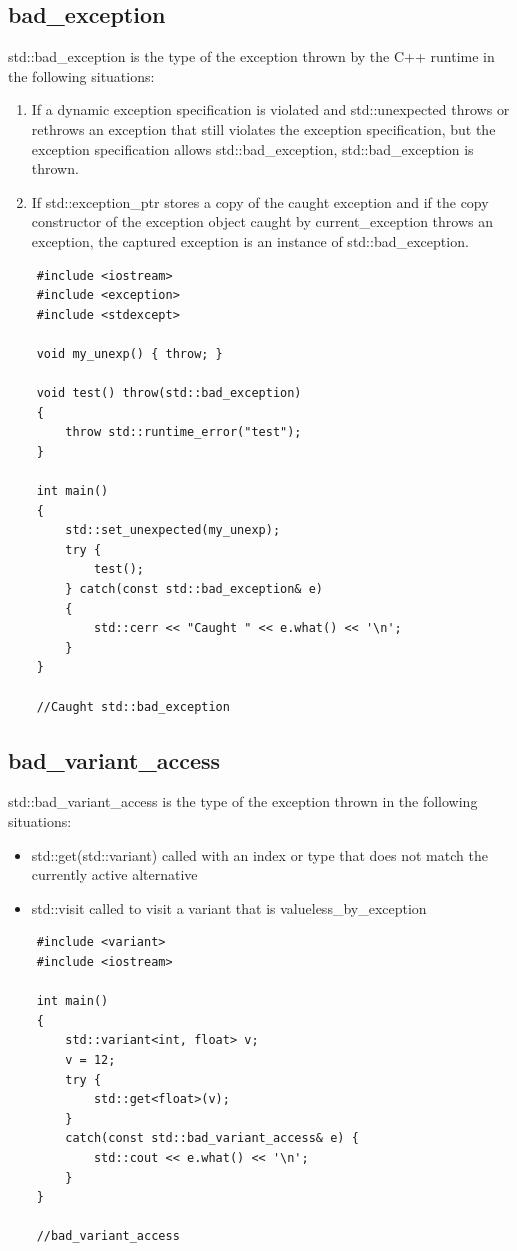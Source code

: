 \documentclass[UTF8,a4paper,12pt]{ctexbook}
\begin{document}
		\subsection{bad\_exception}
			std::bad\_exception is the type of the exception thrown by the C++ runtime in the following situations: 
			
			\begin{enumerate}
				\item If a dynamic exception specification is violated and std::unexpected throws or rethrows an exception that still violates the exception specification, but the exception specification allows std::bad\_exception, std::bad\_exception is thrown.
				\item If std::exception\_ptr stores a copy of the caught exception and if the copy constructor of the exception object caught by current\_exception throws an exception, the captured exception is an instance of std::bad\_exception.
			\end{enumerate}

\begin{lstlisting}
	#include <iostream>
	#include <exception>
	#include <stdexcept>
	
	void my_unexp() { throw; }
	
	void test() throw(std::bad_exception)
	{
		throw std::runtime_error("test");
	}
	
	int main()
	{
		std::set_unexpected(my_unexp);
		try {
			test();
		} catch(const std::bad_exception& e)
		{
			std::cerr << "Caught " << e.what() << '\n';
		}
	}
	
	//Caught std::bad_exception
\end{lstlisting}
		\subsection{bad\_variant\_access}
			std::bad\_variant\_access is the type of the exception thrown in the following situations: 
			\begin{itemize}
				\item std::get(std::variant) called with an index or type that does not match the currently active alternative 
				\item  std::visit called to visit a variant that is valueless\_by\_exception 
			\end{itemize}
\begin{lstlisting}
	#include <variant>
	#include <iostream>
	
	int main()
	{
		std::variant<int, float> v;
		v = 12;
		try {
			std::get<float>(v);
		}
		catch(const std::bad_variant_access& e) {
			std::cout << e.what() << '\n';
		}
	}
	
	//bad_variant_access
\end{lstlisting}
\end{document}
